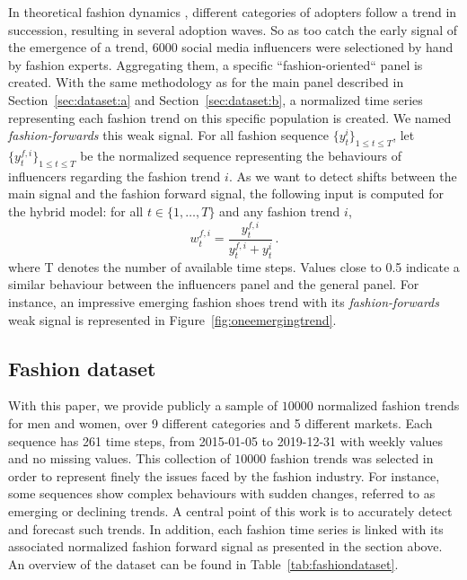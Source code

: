 \documentclass[review]{elsarticle}
\newcommand{\ts}{y}
\newcommand{\ws}{w}
\newcommand{\numberts}{10000}
\begin{document}
In theoretical fashion dynamics \cite{rogers1962}, different categories of adopters follow a trend in succession, resulting in several adoption waves.
So as too catch the early signal of the emergence of a trend, 6000 social media influencers were selectioned by hand by fashion experts. Aggregating them, a specific ``fashion-oriented`` panel is created. With the same methodology as for the main panel described in Section~\ref{sec:dataset:a} and Section~\ref{sec:dataset:b}, a normalized time series representing each fashion trend on this specific population is created. We named \textit{fashion-forwards} this weak signal.  For all fashion sequence $\{y^i_t\}_{1 \leq t \leq T}$, let $\{\ts^{f,i}_t\}_{1 \leq t \leq T}$ be the normalized sequence representing the behaviours of influencers regarding the fashion trend $i$. As we want to detect shifts between the main signal and the fashion forward signal, the following input is computed for the hybrid model: for all $t \in \{1,\ldots,T\}$ and any fashion trend $i$,
$$
\ws^{f,i}_{t} = \frac{\ts_t^{f,i}}{\ts_t^{f,i}+\ts_t^{i}}\,.
$$
where T denotes the number of available time steps. Values close to 0.5 indicate a similar behaviour between the influencers panel and the general panel. For instance, an impressive emerging fashion shoes trend with its \textit{fashion-forwards} weak signal is represented in Figure~\ref{fig:oneemergingtrend}. 

\subsection{Fashion dataset}

With this paper, we provide publicly a sample of $\numberts$ normalized fashion trends for men and women, over 9 different categories and 5 different markets. Each sequence has 261 time steps, from 2015-01-05 to 2019-12-31 with weekly values and no missing values. This collection of $\numberts$ fashion trends was selected in order to represent finely the issues faced by the fashion industry. For instance, some sequences show complex behaviours with sudden changes, referred to as emerging or declining trends. A central point of this work is to accurately detect and forecast such trends. In addition, each fashion time series is linked with its associated normalized fashion forward signal as presented in the section above. An overview of the dataset can be found in Table~\ref{tab:fashiondataset}. 
\end{document}
